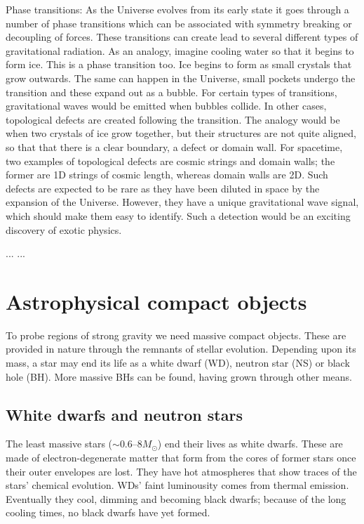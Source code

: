 Phase transitions: As the Universe evolves from its early state it goes through a number of phase transitions which can be associated with symmetry breaking or decoupling of forces. These transitions can create lead to several different types of gravitational radiation. As an analogy, imagine cooling water so that it begins to form ice. This is a phase transition too. Ice begins to form as small crystals that grow outwards. The same can happen in the Universe, small pockets undergo the transition and these expand out as a bubble. For certain types of transitions, gravitational waves would be emitted when bubbles collide. In other cases, topological defects are created following the transition. The analogy would be when two crystals of ice grow together, but their structures are not quite aligned, so that that there is a clear boundary, a defect or domain wall. For spacetime, two examples of topological defects are cosmic strings and domain walls; the former are 1D strings of cosmic length, whereas domain walls are 2D. Such defects are expected to be rare as they have been diluted in space by the expansion of the Universe. However, they have a unique gravitational wave signal, which should make them easy to identify. Such a detection would be an exciting discovery of exotic physics.

...
...

\section{Astrophysical compact objects}

To probe regions of strong gravity we need massive compact objects. These are provided in nature through the remnants of stellar evolution. Depending upon its mass, a star may end its life as a white dwarf (WD), neutron star (NS) or black hole (BH). More massive BHs can be found, having grown through other means.

\subsection{White dwarfs and neutron stars}

The least massive stars ($\sim 0.6$--$8M_\odot$) end their lives as white dwarfs. These are made of electron-degenerate matter that form from the cores of former stars once their outer envelopes are lost. They have hot atmospheres that show traces of the stars' chemical evolution. WDs' faint luminousity comes from thermal emission. Eventually they cool, dimming and becoming black dwarfs; because of the long cooling times, no black dwarfs have yet formed.

